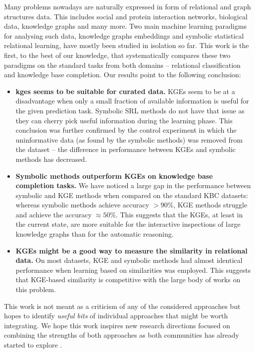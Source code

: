 Many problems nowadays are naturally expressed in form of relational and graph structures data.
This includes social and protein interaction networks, biological data, knowledge graphs and many more.
Two main machine learning paradigms for analysing such data, knowledge graphs embeddings and  symbolic statistical relational learning, have mostly been studied in isolation so far.
This work is the first, to the best of our knowledge, that systematically compares these two paradigms on the standard tasks from both domains -- relational classification and knowledge base completion.
Our results point to the following conclusion:
\begin{itemize}
	\item \textbf{\gls{kge}s seems to be suitable for curated data.}  KGEs seem to be at a disadvantage when only a small fraction of available information is useful for the given prediction task. Symbolic SRL methods do not have that issue as they can cherry pick useful information during the learning phase. This conclusion was further confirmed by the control experiment in which the uninformative data (as found by the symbolic methods) was removed from the dataset -- the difference in performance between KGEs and symbolic methods has decreased.
	\item  \textbf{Symbolic methods outperform KGEs on knowledge base completion tasks.} We have noticed a large gap in the performance between symbolic and KGE methods when compared on the standard KBC datasets: whereas symbolic methods achieve accuracy $> 90$\%, KGE methods struggle and achieve the accuracy $\approx 50$\%. This suggests that the KGEs, at least in the current state, are more suitable for the interactive inspections of large knowledge graphs than for the automatic reasoning.
	\item \textbf{KGEs might be a good way to measure the similarity in relational data.} On most datasets, KGE and symbolic methods had almost identical performance when learning based on similarities was employed. This suggests that KGE-based similarity is competitive with the large body of works on this problem.
\end{itemize}

This work is not meant as a criticism of any of the considered approaches but hopes to identify \textit{useful bits} of individual approaches that might be worth integrating.
We hope this work inspires new research directions focused on combining the strengths of both approaches as both communities has already started to explore \cite{DBLP:conf/uai/MinerviniDRR17,demeester2016lifted,Schlichtkrull2017ModelingRD}.





